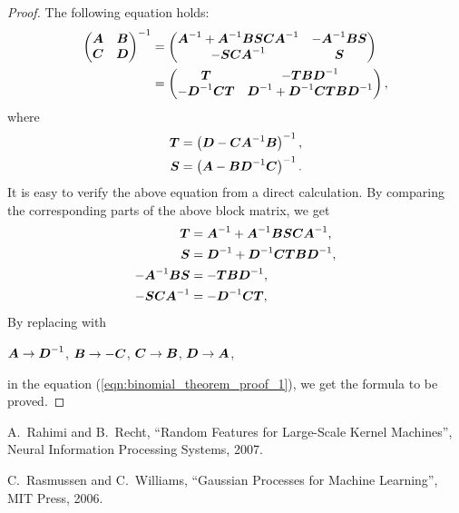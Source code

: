 \documentclass[twocolumn, a4paper, 10pt]{article}
\begin{document}
\begin{proof}
The following equation holds:
\begin{align*}
    \begin{pmatrix}
        \boldsymbol{A} & \boldsymbol{B} \\
        \boldsymbol{C} & \boldsymbol{D}
    \end{pmatrix}^{-1}
    &= \begin{pmatrix}
        \boldsymbol{A}^{-1} + \boldsymbol{A}^{-1} \boldsymbol{BSCA}^{-1} & - \boldsymbol{A}^{-1} \boldsymbol{BS} \\
        - \boldsymbol{SCA}^{-1}                         & \boldsymbol{S}
    \end{pmatrix} \\
    &= \begin{pmatrix}
        \boldsymbol{T}                & -\boldsymbol{TBD}^{-1} \\
        - \boldsymbol{D}^{-1} \boldsymbol{CT} & \boldsymbol{D}^{-1} + \boldsymbol{D}^{-1} \boldsymbol{CTBD}^{-1}
    \end{pmatrix},
\end{align*}
where
\begin{align}
    \boldsymbol{T} &= \left( \boldsymbol{D} - \boldsymbol{CA}^{-1} \boldsymbol{B} \right)^{-1}, \\
    \boldsymbol{S} &= \left( \boldsymbol{A} - \boldsymbol{BD}^{-1} \boldsymbol{C} \right)^{-1}.
\end{align}
It is easy to verify the above equation from a direct calculation.
By comparing the corresponding parts of the above block matrix, we get
\begin{align}
    \boldsymbol{T} &= \boldsymbol{A}^{-1} + \boldsymbol{A}^{-1} \boldsymbol{BSCA}^{-1},
    \label{eqn:binomial_theorem_proof_1} \\
    \boldsymbol{S} &= \boldsymbol{D}^{-1} + \boldsymbol{D}^{-1} \boldsymbol{CTBD}^{-1}, \\
    - \boldsymbol{A}^{-1} \boldsymbol{BS} &= - \boldsymbol{TBD}^{-1}, \\
    - \boldsymbol{SCA}^{-1} &= - \boldsymbol{D}^{-1} \boldsymbol{CT},
\end{align}
By replacing with
\begin{center}
    $\boldsymbol{A} \to \boldsymbol{D}^{-1}$, \hspace{5pt}
    $\boldsymbol{B} \to -\boldsymbol{C}$, \hspace{5pt}
    $\boldsymbol{C} \to \boldsymbol{B}$, \hspace{5pt}
    $\boldsymbol{D} \to \boldsymbol{A}$,
\end{center}
in the equation (\ref{eqn:binomial_theorem_proof_1}), we get the formula to be proved.
\end{proof}


\pagebreak

\begin{thebibliography}{9}

    A.~Rahimi and B.~Recht, 
    ``Random Features for Large-Scale Kernel Machines'',
    Neural Information Processing Systems, 2007.

    C.~Rasmussen and C.~Williams, ``Gaussian Processes for Machine Learning'', MIT Press, 2006.

\end{thebibliography}
\end{document}
